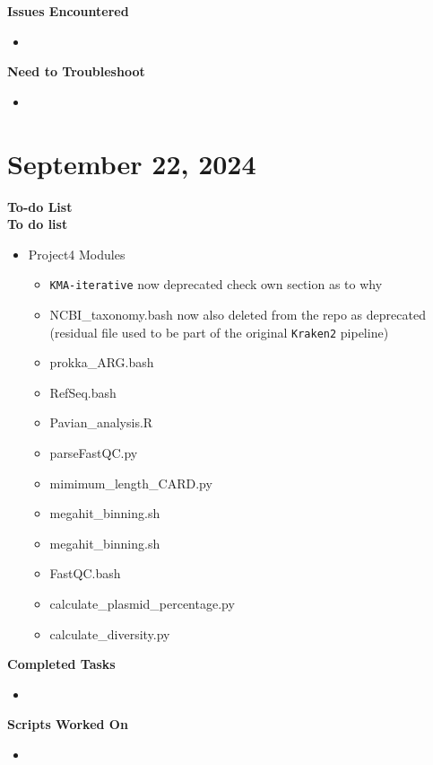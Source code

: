 \documentclass[11pt]{report}
\newcommand{\done}{\checkmark}
\begin{document}
{\textbf{Issues Encountered}
\begin{itemize}
	\item 
\end{itemize}

\textbf{Need to Troubleshoot}
\begin{itemize}
	\item 
\end{itemize}
\newpage
\section{September 22, 2024}
\textbf{To-do List} \\


\textbf{To do list}
\begin{itemize}
	\item [\done] Project4 Modules
	\begin{itemize}
		\item [\done] \texttt{KMA-iterative} now deprecated check own section as to why
		\item [\done] NCBI\_taxonomy.bash now also deleted from the repo as deprecated (residual file used to be part of the original \texttt{Kraken2} pipeline)
		\item [\done] prokka\_ARG.bash
		\item [\done] RefSeq.bash
		\item [\done] Pavian\_analysis.R
		\item [\done] parseFastQC.py
		\item [\done] mimimum\_length\_CARD.py
		\item [\done] megahit\_binning.sh
		\item [\done] megahit\_binning.sh
		\item [\done] FastQC.bash
		\item [\done] calculate\_plasmid\_percentage.py
		\item [\done] calculate\_diversity.py
	\end{itemize}
\end{itemize}


\textbf{Completed Tasks} 
\begin{itemize}
	\item
\end{itemize}

\textbf{Scripts Worked On}
\begin{itemize}
	\item 
\end{itemize}


}
\end{document}
